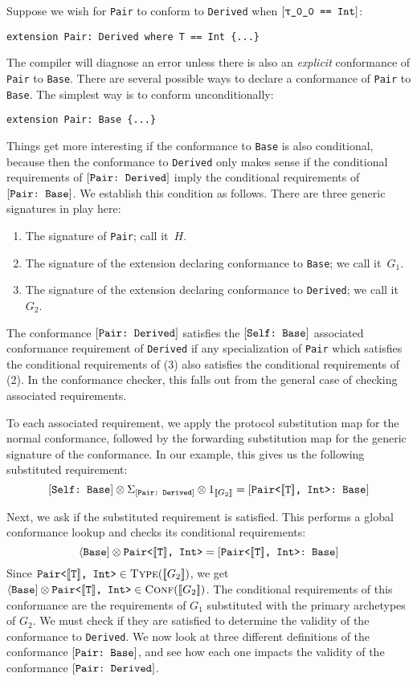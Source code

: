 \documentclass[../generics]{subfiles}
\begin{document}
Suppose we wish for \texttt{Pair} to conform to \texttt{Derived} when $\SameReq{\rT}{Int}$:
\begin{Verbatim}
extension Pair: Derived where T == Int {...}
\end{Verbatim}
The compiler will diagnose an error unless there is also an \emph{explicit} conformance of \texttt{Pair} to \texttt{Base}. There are several possible ways to declare a conformance of \texttt{Pair} to \texttt{Base}. The simplest way is to conform unconditionally:
\begin{Verbatim}
extension Pair: Base {...}
\end{Verbatim}
Things get more interesting if the conformance to \texttt{Base} is also conditional, because then the conformance to \texttt{Derived} only makes sense if the conditional requirements of $[\texttt{Pair:~Derived}]$ imply the conditional requirements of $[\texttt{Pair:~Base}]$. We establish this condition as follows. There are three generic signatures in play here:
\begin{enumerate}
\item The signature of \texttt{Pair}; call it~$H$.
\item The signature of the extension declaring conformance to \texttt{Base}; we call it~$G_1$.
\item The signature of the extension declaring conformance to \texttt{Derived}; we call it~$G_2$.
\end{enumerate}
The conformance $[\texttt{Pair:~Derived}]$ satisfies the $[\texttt{Self:~Base}]$ associated conformance requirement of \texttt{Derived} if any specialization of \verb|Pair| which satisfies the conditional requirements of (3) also satisfies the conditional requirements of (2). In the conformance checker, this falls out from the general case of checking associated requirements.

To each associated requirement, we apply the protocol substitution map for the normal conformance, followed by the forwarding substitution map for the generic signature of the conformance. In our example, this gives us the following substituted requirement:
\[
[\texttt{Self:~Base}]\otimes\Sigma_{[\texttt{Pair:~Derived}]}\otimes 1_{[\![G_2]\!]} = [\texttt{Pair<$[\![\texttt{T}]\!]$, Int>:~Base}]
\]

Next, we ask  if the substituted requirement is satisfied. This performs a global conformance lookup and checks its conditional requirements:
\[
\langle\texttt{Base}]\otimes \texttt{Pair<$[\![\texttt{T}]\!]$, Int>} = [\texttt{\texttt{Pair<$[\![\texttt{T}]\!]$, Int>}:~Base}]
\]
Since $\texttt{Pair<$[\![\texttt{T}]\!]$, Int>}\in\textsc{Type}({[\![G_2]\!]})$, we get $\langle\texttt{Base}]\otimes \texttt{Pair<$[\![\texttt{T}]\!]$, Int>}\in\textsc{Conf}({[\![G_2]\!]})$. The conditional requirements of this conformance are the requirements of $G_1$ substituted with the primary archetypes of $G_2$. We must check if they are satisfied to determine the validity of the conformance to \texttt{Derived}. We now look at three different definitions of the conformance $[\texttt{Pair:~Base}]$, and see how each one impacts the validity of the conformance $[\texttt{Pair:~Derived}]$.
\end{document}
